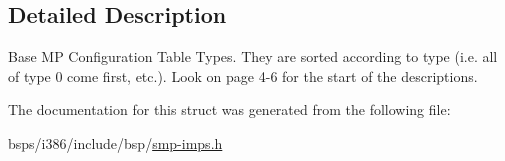 \subsection{Detailed Description}
Base MP Configuration Table Types. They are sorted according to type (i.\+e. all of type 0 come first, etc.). Look on page 4-\/6 for the start of the descriptions. 

The documentation for this struct was generated from the following file\+:\begin{DoxyCompactItemize}
\item 
bsps/i386/include/bsp/\mbox{\hyperlink{smp-imps_8h}{smp-\/imps.\+h}}\end{DoxyCompactItemize}
